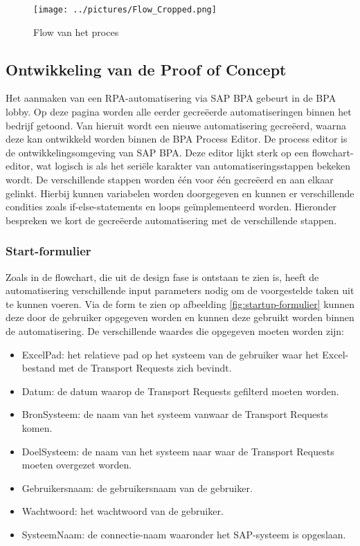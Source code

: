 \begin{figure}
    \centering
    \texttt{[image: ../pictures/Flow\_Cropped.png]}
    \caption{Flow van het proces}
    \label{fig:flowchart}
\end{figure}
\label{fig:flowchart}

\subsection{Ontwikkeling van de Proof of Concept}
\label{subsec:ontwikkeling-proof-of-concept}

Het aanmaken van een RPA-automatisering via SAP BPA gebeurt in de BPA lobby. Op deze pagina worden alle eerder gecreëerde automatiseringen binnen het bedrijf getoond. Van hieruit wordt een nieuwe automatisering gecreëerd, waarna deze kan ontwikkeld worden binnen de BPA Process Editor. De process editor is de ontwikkelingsomgeving van SAP BPA.
Deze editor lijkt sterk op een flowchart-editor, wat logisch is als het seriële karakter van automatiseringsstappen bekeken wordt. De verschillende stappen worden één voor één gecreëerd en aan elkaar gelinkt. Hierbij kunnen variabelen worden doorgegeven en kunnen er verschillende condities zoals if-else-statements en loops geïmplementeerd worden.
Hieronder bespreken we kort de gecreëerde automatisering met de verschillende stappen.

\subsubsection{Start-formulier}
\label{subsubsec:start-formulier}

Zoals in de flowchart, die uit de design fase is ontstaan te zien is, heeft de automatisering verschillende input parameters nodig om de voorgestelde taken uit te kunnen voeren. Via de form te zien op afbeelding \ref{fig:startup-formulier} kunnen deze door de gebruiker opgegeven worden en kunnen deze gebruikt worden binnen de automatisering.
De verschillende waardes die opgegeven moeten worden zijn:

\begin{itemize}
    \item ExcelPad: het relatieve pad op het systeem van de gebruiker waar het Excel-bestand met de Transport Requests zich bevindt.
    \item Datum: de datum waarop de Transport Requests gefilterd moeten worden.
    \item BronSysteem: de naam van het systeem vanwaar de Transport Requests komen.
    \item DoelSysteem: de naam van het systeem naar waar de Transport Requests moeten overgezet worden.
    \item Gebruikersnaam: de gebruikersnaam van de gebruiker.
    \item Wachtwoord: het wachtwoord van de gebruiker.
    \item SysteemNaam: de connectie-naam waaronder het SAP-systeem is opgeslaan.
\end{itemize}

